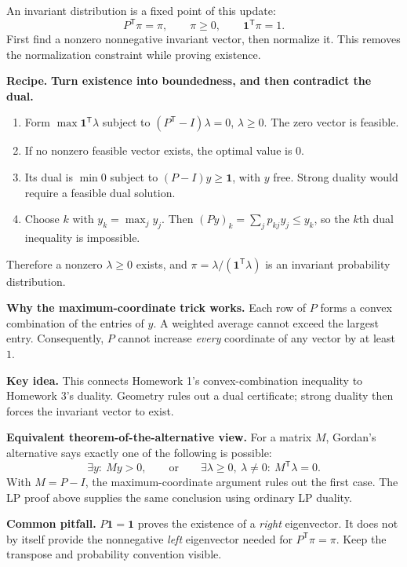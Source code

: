 \documentclass[11pt]{article}
\newenvironment{keyidea}{\begin{shaded}\noindent\textbf{Key idea.} }{\end{shaded}}
\newenvironment{pitfall}{\begingroup\colorlet{shadecolor}{warncolor}\begin{shaded}\noindent\textbf{Common pitfall.} }{\end{shaded}\endgroup}
\newenvironment{recipe}{\begin{framed}\noindent\textbf{Recipe.} }{\end{framed}}
\newcommand{\T}{^{\mathsf T}}
\newcommand{\ones}{\mathbf 1}
\begin{document}
An invariant distribution is a fixed point of this update:
\[
P\T\pi=\pi,\qquad \pi\ge0,\qquad\ones\T\pi=1.
\]
First find a nonzero nonnegative invariant vector, then normalize it.
This removes the normalization constraint while proving existence.

\begin{recipe}
\textbf{Turn existence into boundedness, and then contradict the dual.}
\begin{enumerate}
\item Form $\max\ones\T\lambda$ subject to
$(P\T-I)\lambda=0$, $\lambda\ge0$. The zero vector is feasible.
\item If no nonzero feasible vector exists, the optimal value is $0$.
\item Its dual is $\min0$ subject to $(P-I)y\ge\ones$, with $y$ free.
Strong duality would require a feasible dual solution.
\item Choose $k$ with $y_k=\max_jy_j$. Then
$(Py)_k=\sum_jp_{kj}y_j\le y_k$, so the $k$th dual inequality is impossible.
\end{enumerate}
Therefore a nonzero $\lambda\ge0$ exists, and
$\pi=\lambda/(\ones\T\lambda)$ is an invariant probability distribution.
\end{recipe}

\textbf{Why the maximum-coordinate trick works.} Each row of $P$ forms
a convex combination of the entries of $y$. A weighted average cannot
exceed the largest entry. Consequently, $P$ cannot increase \emph{every}
coordinate of any vector by at least $1$.

\begin{keyidea}
This connects Homework 1's convex-combination inequality to Homework 3's
duality. Geometry rules out a dual certificate; strong duality then forces
the invariant vector to exist.
\end{keyidea}

\textbf{Equivalent theorem-of-the-alternative view.} For a matrix $M$,
Gordan's alternative says exactly one of the following is possible:
\[
\exists y:\ My>0,
\qquad\text{or}\qquad
\exists\lambda\ge0,\ \lambda\ne0:\ M\T\lambda=0.
\]
With $M=P-I$, the maximum-coordinate argument rules out the first case.
The LP proof above supplies the same conclusion using ordinary LP duality.

\begin{pitfall}
$P\ones=\ones$ proves the existence of a \emph{right} eigenvector.
It does not by itself provide the nonnegative \emph{left} eigenvector
needed for $P\T\pi=\pi$. Keep the transpose and probability convention visible.
\end{pitfall}
\end{document}
